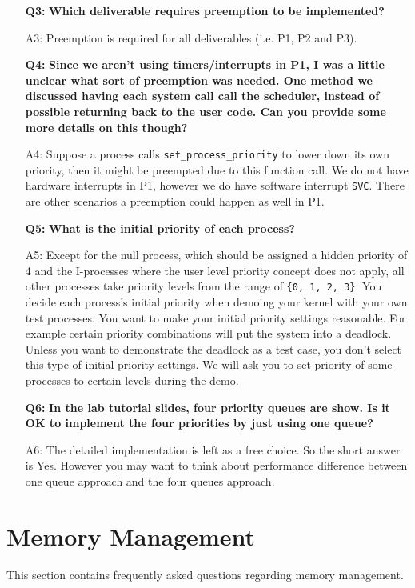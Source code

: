 \begin{itemize}
\item [{\bf Q3:}] {\bf Which deliverable requires preemption to be implemented?}

\item[A3:] Preemption is required for all deliverables (i.e. P1, P2 and P3).

\item[{\bf Q4:}] {\bf Since we aren't using timers/interrupts in P1, I was a little unclear what sort of preemption was needed. One method we discussed having each system call call the scheduler, instead of possible returning back to the user code. Can you provide some more details on this though?}

\item[A4:]
Suppose a process calls \verb+set_process_priority+ to lower down its own priority, then it might be preempted due to this function call. We do not have hardware interrupts in P1, however we do have software interrupt \verb+SVC+. There are other scenarios a preemption could happen as well in P1.

\item[{\bf Q5:}] {\bf What is the initial priority of each process?}
\item[A5:] Except for the null process, which should be assigned a hidden priority of 4 and the I-processes where the user level priority concept does not apply, all other processes take priority levels from the range of \verb+{0, 1, 2, 3}+. You decide each process's initial priority when demoing your kernel with your own test processes. You want to make your initial priority settings reasonable. For example certain priority combinations will put the system into a deadlock. Unless you want to demonstrate the deadlock as a test case, you don't select this type of initial priority settings. We will ask you to set priority of some processes to certain levels during the demo.

\item[{\bf Q6:}] {\bf In the lab tutorial slides, four priority queues are show. Is it OK to implement the four priorities by just using one queue?}
\item[{A6:}] The detailed implementation is left as a free choice. So the short answer is Yes. However you may want to think about performance difference between one queue approach and the four queues approach.

\end{itemize}

\section{Memory Management}
This section contains frequently asked questions regarding memory management.

